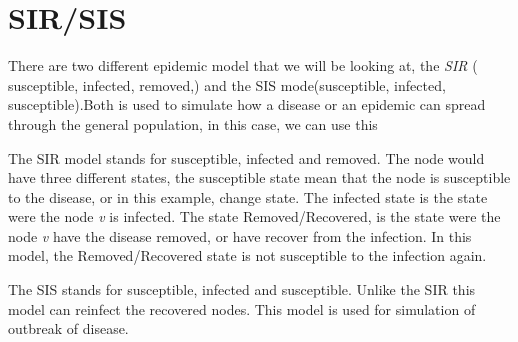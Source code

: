 \section{SIR/SIS}
There are two different epidemic model that we will be looking at, the {\it SIR} ( susceptible, infected, removed,) and the SIS mode(susceptible, infected, susceptible).Both is used to simulate how a disease or an epidemic can spread through the general population, in this case, we can use this 

The SIR model stands for susceptible, infected and removed. The node would have three different states, the susceptible state mean that the node is susceptible to the disease, or in this example, change state. The infected state is the state were the node {\it v} is infected. The state Removed/Recovered, is the state were the node {\it v} have the disease removed, or have recover from the infection. In this model, the Removed/Recovered state is not susceptible to the infection again. 

The SIS stands for susceptible, infected and susceptible. Unlike the SIR this model can reinfect the recovered nodes. This model is used for simulation of outbreak of disease. 